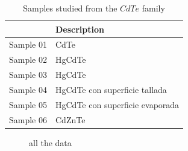 \begin{table}[H]
	\centering
	\begin{tabular}{lC}
		\hline
		\hline
		&  Description\\
		\hline
		Sample 01 & CdTe \\
		Sample 02 & HgCdTe\\
		Sample 03 & HgCdTe\\
		Sample 04 & HgCdTe con superficie tallada \\
		Sample 05 & HgCdTe con superficie evaporada\\
		Sample 06 & CdZnTe\\
		\hline
		\hline
	\end{tabular}
	\caption{Samples studied from the $CdTe$ family}
	\label{tab:CH 3 Section 3.1 Photodectors materials}
\end{table}

\begin{figure}[htp] 
	\centering
	
	
	\caption{all the data}
\end{figure}


